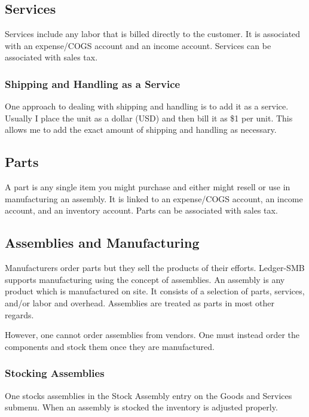 \documentclass{article}
\begin{document}
\subsection{Services}

Services include any labor that is billed directly to the customer.  It is
associated with an expense/COGS account and an income account.  Services can be
associated with sales tax.

\subsubsection{Shipping and Handling as a Service}

One approach to dealing with shipping and handling is to add it as a service.
Usually I place the unit as a dollar (USD) and then bill it as \$1 per unit.
This allows me to add the exact amount of shipping and handling as necessary.

\subsection{Parts}

A part is any single item you might purchase and either might resell or use in
manufacturing an assembly.  It is linked to an expense/COGS
account, an income account, and an inventory account.  Parts can be associated
with sales tax.

\subsection{Assemblies and Manufacturing}

Manufacturers order parts but they sell the products of their efforts.
Ledger-SMB supports manufacturing using the concept of assemblies.  An assembly
is any product which is manufactured on site.  It consists of a selection of
parts, services, and/or labor and overhead.  Assemblies are treated as parts in
most other regards.

However, one cannot order assemblies from vendors.  One must instead order the
components and stock them once they are manufactured.


\subsubsection{Stocking Assemblies}

One stocks assemblies in the Stock Assembly entry on the Goods and Services
submenu.  When an assembly is stocked the inventory is adjusted properly.
\end{document}
